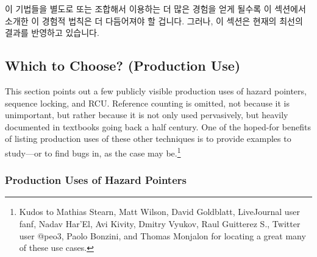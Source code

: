 이 기법들을 별도로 또는 조합해서 이용하는 더 많은 경험을 얻게 될수록 이
섹션에서 소개한 이 경험적 법칙은 더 다듬어져야 할 겁니다.
그러나, 이 섹션은 현재의 최선의 결과를 반영하고 있습니다.

\iffalse

Finally, the ``Lines of Code'' row shows the size of the Pre-BSD
Routing Table implementations, giving a rough idea of relative ease of use.
That said, it is important to note that the reference-counting and
sequence-locking implementations are buggy, and that a correct
reference-counting implementation is considerably
more complex~\cite{Valois95a,MagedMichael95a}.
For its part, a correct sequence-locking implementation requires
the addition of some other synchronization mechanism, for example,
hazard pointers or RCU, so that sequence locking detects concurrent
updates and the other mechanism provides safe reference acquisition.

As more experience is gained using these techniques, both separately
and in combination, the rules of thumb laid out in this section will
need to be refined.
However, this section does reflect the current state of the art.

\fi

\subsection{Which to Choose? (Production Use)}
\label{sec:defer:Which to Choose? (Production Use)}

This section points out a few publicly visible production uses of
hazard pointers, sequence locking, and RCU\@.
Reference counting is omitted, not because it is unimportant, but rather
because it is not only used pervasively, but heavily documented in textbooks
going back a half century.
One of the hoped-for benefits of listing production uses of these other
techniques is to provide examples to study---or to find bugs in, as
the case may be.\footnote{
	Kudos to Mathias Stearn, Matt Wilson, David Goldblatt, LiveJournal
	user fanf, Nadav Har'El, Avi Kivity, Dmitry Vyukov, Raul Guitterez
	S., Twitter user @peo3, Paolo Bonzini, and Thomas Monjalon for
	locating a great many of these use cases.}

\subsubsection{Production Uses of Hazard Pointers}
\label{sec:defer:Production Uses of Hazard Pointers}

